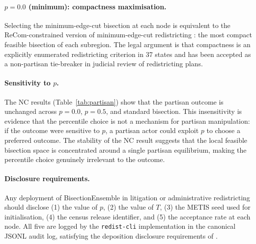 \paragraph{$p = 0.0$ (minimum): compactness maximisation.}
Selecting the minimum-edge-cut bisection at each node is equivalent to
the ReCom-constrained version of minimum-edge-cut redistricting
\citep{dellaLibera2026mec}: the most compact feasible bisection of each
subregion. The legal argument is that compactness is an explicitly enumerated
redistricting criterion in 37 states and has been accepted as a non-partisan
tie-breaker in judicial review of redistricting plans.

\paragraph{Sensitivity to $p$.}
The NC results (Table~\ref{tab:partisan}) show that the partisan outcome is
unchanged across $p = 0.0$, $p = 0.5$, and standard bisection. This insensitivity
is evidence that the percentile choice is not a mechanism for partisan manipulation:
if the outcome were sensitive to $p$, a partisan actor could exploit $p$ to
choose a preferred outcome. The stability of the NC result suggests that the
local feasible bisection space is concentrated around a single partisan equilibrium,
making the percentile choice genuinely irrelevant to the outcome.

\paragraph{Disclosure requirements.}
Any deployment of BisectionEnsemble in litigation or administrative redistricting
should disclose (1) the value of $p$, (2) the value of $T$, (3) the METIS seed
used for initialisation, (4) the census release identifier, and (5) the
acceptance rate at each node. All five are logged by the \texttt{redist-cli}
implementation in the canonical JSONL audit log, satisfying the deposition
disclosure requirements of \citet{dellaLibera2026depo}.
